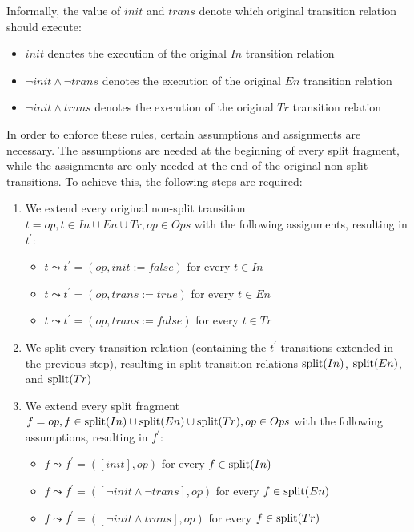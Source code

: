 Informally, the value of $init$ and $trans$ denote which original transition relation should execute:
\begin{itemize}
    \item $init$ denotes the execution of the original $In$ transition relation
        \item $\neg init \land \neg trans$ denotes the execution of the original $En$ transition relation
    \item $\neg init \land trans$ denotes the execution of the original $Tr$ transition relation
\end{itemize}

In order to enforce these rules, certain assumptions and assignments are necessary. The assumptions are needed at the beginning of every split fragment, while the assignments are only needed at the end of the original non-split transitions. To achieve this, the following steps are required:

\begin{enumerate}
    \item We extend every original non-split transition $t = op, t \in In \cup En \cup Tr, op \in Ops$ with the following assignments, resulting in $t^\prime$:
    \begin{itemize}
        \item $t \leadsto t^\prime=(op, init:=\textit{false})$ for every $t \in In$
        \item $t \leadsto t^\prime=(op, trans:=\textit{true})$ for every $t \in En$
        \item $t \leadsto t^\prime=(op, trans:=\textit{false})$ for every $t \in Tr$
    \end{itemize}
    \item We split every transition relation (containing the $t^\prime$ transitions extended in the previous step), resulting in split transition relations $\mathrm{split}(In)$, $\mathrm{split}(En)$, and $\mathrm{split}(Tr)$
    \item We extend every split fragment $f = op, f \in \mathrm{split}(In) \cup \mathrm{split}(En) \cup \mathrm{split}(Tr), op \in Ops$ with the following assumptions, resulting in $f^\prime$:
    \begin{itemize}
        \item $f \leadsto f^\prime=([init], op)$ for every $f \in \mathrm{split}(In)$
        \item $f \leadsto f^\prime=([\neg init \land \neg trans], op)$ for every $f \in \mathrm{split}(En)$
        \item $f \leadsto f^\prime=([\neg init \land trans], op)$ for every $f \in \mathrm{split}(Tr)$
    \end{itemize}
\end{enumerate}

